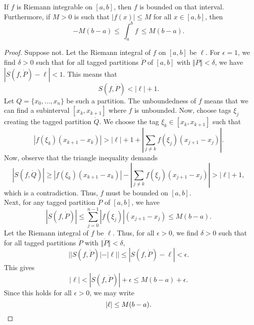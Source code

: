 \documentclass[11pt]{article}
\theoremstyle{definition}
\theoremstyle{remark}
\numberwithin{equation}{module}
\begin{document}
    \begin{theorem}\label{th:bounded}
        If $f$ is Riemann integrable on $[a, b]$, then $f$ is bounded on that interval.
        Furthermore, if $M > 0$ is such that $|f(x)| \leq M$ for all $x \in [a, b]$,
        then \[
            -M(b - a) \leq\, \int_a^b f \,\leq M(b - a).
        \] 
    \end{theorem}
    \begin{proof}
        Suppose not. Let the Riemann integral of $f$ on $[a, b]$ be $\ell$. For
        $\epsilon = 1$, we find $\delta > 0$ such that for all tagged partitions
        $\dot{P}$ of $[a, b]$ with $\Vert\dot{P}\Vert < \delta$, we have $|S(f,
        \dot{P}) - \ell| < 1$. This means that \[
            S(f, \dot{P}) < |\ell| + 1.
        \] Let $Q = \{x_0, \dots, x_n\}$ be such a partition. The unboundedness of
        $f$ means that we can find a subinterval $[x_k, x_{k + 1}]$ where $f$ is
        unbounded. Now, choose tags $\xi_j$ creating the tagged partition $\dot{Q}$.
        We choose the tag $\xi_k \in [x_k, x_{k + 1}]$ such
        that \[
            |f(\xi_k)(x_{k + 1} - x_k)| > |\ell| + 1 + |\sum_{j \neq k}
            f(\xi_j)(x_{j + 1} - x_j)|.
        \] Now, observe that the triangle inequality demands \[
            |S(f, \dot{Q})| \geq |f(\xi_{k})(x_{k + 1} - x_k)| - |\sum_{j \neq k}
            f(\xi_j)(x_{j + 1} - x_j)| > |\ell| + 1,
        \] which is a contradiction. Thus, $f$ must be bounded on $[a, b]$. \\
        
        \noindent
        Next, for any tagged partition $\dot{P}$ of $[a, b]$, we have \[
            |S(f, \dot{P})| \leq \sum_{j = 0}^{n - 1}|f(\xi_j)|(x_{j + 1} - x_j) \leq
            M(b - a).
        \] Let the Riemann integral of $f$ be $\ell$.
        Thus, for all $\epsilon > 0$, we find $\delta > 0$ such that for all
        tagged partitions $\dot{P}$ with $\Vert\dot{P}\Vert < \delta$, \[
            | |S(f, \dot{P})| - |\ell| | \leq |S(f, \dot{P}) - \ell| < \epsilon.
        \] This gives \[
            |\ell| < |S(f, \dot{P})| + \epsilon \leq M(b - a) + \epsilon.
        \] Since this holds for all $\epsilon > 0$, we may write \[
            |\ell| \leq M(b - a). \qedhere
        \] 
    \end{proof}
\end{document}
